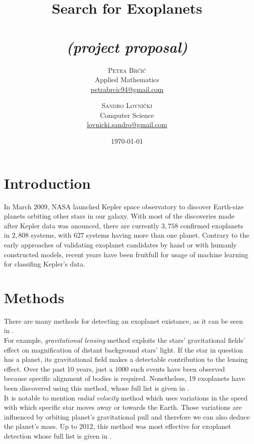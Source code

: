 \documentclass[twoside]{article}
\title{Search for Exoplanets\\ \large \textit{\\(project proposal)}} %
\author{%
\textsc{Petra Br\v{c}i\'c}\\%
\normalsize Applied Mathematics \\
\normalsize \href{mailto:petrabrcic94@gmail.com}{petrabrcic94@gmail.com} 
\and
\textsc{Sandro Lovni\v{c}ki}\\%
\normalsize Computer Science \\ 
\normalsize \href{mailto:lovnicki.sandro@gmail.com}{lovnicki.sandro@gmail.com}
}
\date{\today}
\begin{document}
\maketitle

\begin{multicols}{2}

\section{Introduction}
In March 2009, NASA launched Kepler space observatory to discover Earth-size planets orbiting other stars in our galaxy. With most of the discoveries made after Kepler data was anounced, there are currently $3,758$ confirmed exoplanets in $2,808$ systems, with $627$ systems having more than one planet. Contrary to the early approaches of validating exoplanet candidates by hand or with humanly constructed models, recent years have been fruitfull for usage of machine learning for classifing Kepler's data.

\section{Methods}
There are many methods for detecting an exoplanet existance, as it can be seen in \cite{exo:methods}.\\
For example, \textit{gravitational lensing} method exploits the stars' gravitational fields' effect on magnification of distant background stars' light. If the star in question has a planet, its gravitational field makes a detectable contribution to the lensing effect. Over the past 10 years, just a $1000$ such events have been observed because specific alignment of bodies is required. Nonetheless, 19 exoplanets have been discovered using this method, whose full list is given in \cite{microlensing:exos}.\\
It is notable to mention \textit{radial velocity} method which uses variations in the speed with which specific star moves away or towards the Earth. Those variations are influenced by orbiting planet's gravitational pull and therefore we can also deduce the planet's mass. Up to 2012, this method was most effective for exoplanet detection whose full list is given in \cite{radial:exos}.


\end{multicols}
\end{document}
